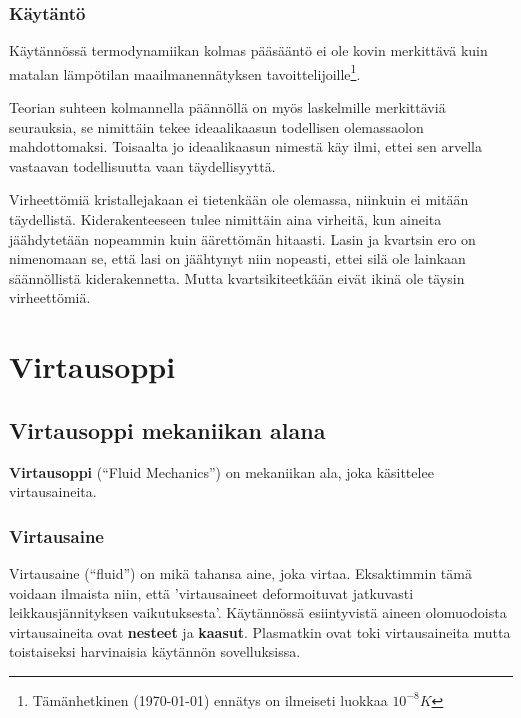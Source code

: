 \documentclass[12pt,a4paper,finnish]{book}
\begin{document}
\section{Käytäntö} %

Käytännössä termodynamiikan kolmas pääsääntö ei ole kovin merkittävä kuin matalan lämpötilan 
maailmanennätyksen tavoittelijoille\footnote{Tämänhetkinen (\today) ennätys on ilmeiseti luokkaa $10^{-8}K$}. 

Teorian suhteen kolmannella päännöllä on myös laskelmille merkittäviä seurauksia, se nimittäin 
tekee ideaalikaasun todellisen olemassaolon mahdottomaksi. Toisaalta jo ideaalikaasun nimestä käy ilmi, 
ettei sen arvella vastaavan todellisuutta vaan täydellisyyttä.

Virheettömiä kristallejakaan ei tietenkään ole olemassa, niinkuin ei mitään täydellistä. Kiderakenteeseen 
tulee nimittäin aina virheitä, kun aineita jäähdytetään nopeammin kuin äärettömän hitaasti. Lasin 
ja kvartsin ero on nimenomaan se, että lasi on jäähtynyt niin nopeasti, ettei silä ole lainkaan säännöllistä 
kiderakennetta. Mutta kvartsikiteetkään eivät ikinä ole täysin virheettömiä.

\part{Virtausoppi} %

\chapter{Virtausoppi mekaniikan alana}
\textbf{Virtausoppi} (``Fluid Mechanics'') on mekaniikan ala, joka käsittelee virtausaineita.

\section{Virtausaine}

Virtausaine (``fluid'') on mikä tahansa aine, joka virtaa. Eksaktimmin tämä voidaan ilmaista niin, 
että 'virtausaineet deformoituvat jatkuvasti leikkausjännityksen vaikutuksesta'. Käytännössä esiintyvistä 
aineen olomuodoista virtausaineita ovat \textbf{nesteet} ja \textbf{kaasut}. Plasmatkin ovat toki 
virtausaineita mutta toistaiseksi harvinaisia käytännön sovelluksissa.
\end{document}
